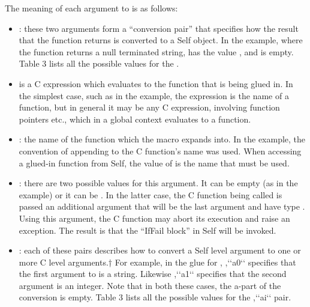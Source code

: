 \documentclass[letterpaper,10pt,english]{sphinxmanual}
\begin{document}
The meaning of each argument to  is as follows:
\begin{itemize}
\item {} 
: these two arguments form a “conversion pair” that specifies how the result that the function returns is converted to a Self object. In the  example, where the function returns a null terminated string,  has the value , and  is empty. Table 3 lists all the possible values for the .

\item {} 
 is a C expression which evaluates to the function that is being glued in. In the simplest case, such as in the  example, the expression is the name of a function, but in general it may be any C expression, involving function pointers etc., which in a global context evaluates to a function.

\item {} 
: the name of the function which the  macro expands into. In the  example, the convention of appending  to the C function’s name was used. When accessing a glued-in function from Self, the value of  is the name that must be used.

\item {} 
: there are two possible values for this argument. It can be empty (as in the example) or it can be . In the latter case, the C function being called is passed an additional argument that will be the last argument and have type . Using this argument, the C function may abort its execution and raise an exception. The result is that the “IfFail block” in Self will be invoked.

\item {} 
: each of these pairs describes how to convert a Self level argument to one or more C level arguments.† For example, in the glue for , ,{}`{}`a0{}`{}` specifies that the first argument to  is a string. Likewise ,{}`{}`a1{}`{}` specifies that the second argument is an integer. Note that in both these cases, the a-part of the conversion is empty. Table 3 lists all the possible values for the ,{}`{}`ai{}`{}` pair.

\end{itemize}
\end{document}
